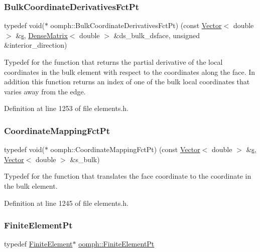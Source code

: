 \subsubsection{\texorpdfstring{Bulk\+Coordinate\+Derivatives\+Fct\+Pt}{BulkCoordinateDerivativesFctPt}}
{\footnotesize\ttfamily typedef void($\ast$ oomph\+::\+Bulk\+Coordinate\+Derivatives\+Fct\+Pt) (const \hyperlink{classoomph_1_1Vector}{Vector}$<$ double $>$ \&\hyperlink{cfortran_8h_ab7123126e4885ef647dd9c6e3807a21c}{s}, \hyperlink{classoomph_1_1DenseMatrix}{Dense\+Matrix}$<$ double $>$ \&ds\+\_\+bulk\+\_\+dsface, unsigned \&interior\+\_\+direction)}



Typedef for the function that returns the partial derivative of the local coordinates in the bulk element with respect to the coordinates along the face. In addition this function returns an index of one of the bulk local coordinates that varies away from the edge. 



Definition at line 1253 of file elements.\+h.

\mbox{\label{namespaceoomph_afa5c7a93cae1917e874b392601be0bde}} 
\subsubsection{\texorpdfstring{Coordinate\+Mapping\+Fct\+Pt}{CoordinateMappingFctPt}}
{\footnotesize\ttfamily typedef void($\ast$ oomph\+::\+Coordinate\+Mapping\+Fct\+Pt) (const \hyperlink{classoomph_1_1Vector}{Vector}$<$ double $>$ \&\hyperlink{cfortran_8h_ab7123126e4885ef647dd9c6e3807a21c}{s}, \hyperlink{classoomph_1_1Vector}{Vector}$<$ double $>$ \&s\+\_\+bulk)}



Typedef for the function that translates the face coordinate to the coordinate in the bulk element. 



Definition at line 1245 of file elements.\+h.

\mbox{\label{namespaceoomph_a3a774afab5900fed47e092a013f9efb8}} 
\subsubsection{\texorpdfstring{Finite\+Element\+Pt}{FiniteElementPt}}
{\footnotesize\ttfamily typedef \hyperlink{classoomph_1_1FiniteElement}{Finite\+Element}$\ast$ \hyperlink{namespaceoomph_a3a774afab5900fed47e092a013f9efb8}{oomph\+::\+Finite\+Element\+Pt}}



